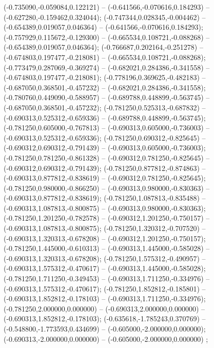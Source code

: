  (-0.735090,-0.059084,0.122121) -- (-0.641566,-0.070616,0.184293) -- (-0.627280,-0.159462,0.324044);
 (-0.747344,0.028345,-0.004462) -- (-0.654389,0.019057,0.046364) -- (-0.641566,-0.070616,0.184293);
 (-0.757929,0.115672,-0.129300) -- (-0.665534,0.108721,-0.088268) -- (-0.654389,0.019057,0.046364);
 (-0.766687,0.202164,-0.251278) -- (-0.674803,0.197477,-0.218081) -- (-0.665534,0.108721,-0.088268);
 (-0.773479,0.287069,-0.369274) -- (-0.682021,0.284386,-0.341558) -- (-0.674803,0.197477,-0.218081);
 (-0.778196,0.369625,-0.482183) -- (-0.687050,0.368501,-0.457232) -- (-0.682021,0.284386,-0.341558);
 (-0.780760,0.449090,-0.588957) -- (-0.689788,0.448899,-0.563745) -- (-0.687050,0.368501,-0.457232);
 (-0.781250,0.525313,-0.687832) -- (-0.690313,0.525312,-0.659336) -- (-0.689788,0.448899,-0.563745);
 (-0.781250,0.605000,-0.767813) -- (-0.690313,0.605000,-0.736003) -- (-0.690313,0.525312,-0.659336);
 (-0.781250,0.690312,-0.825645) -- (-0.690312,0.690312,-0.791439) -- (-0.690313,0.605000,-0.736003);
 (-0.781250,0.781250,-0.861328) -- (-0.690312,0.781250,-0.825645) -- (-0.690312,0.690312,-0.791439);
 (-0.781250,0.877812,-0.874863) -- (-0.690313,0.877812,-0.838619) -- (-0.690312,0.781250,-0.825645);
 (-0.781250,0.980000,-0.866250) -- (-0.690313,0.980000,-0.830363) -- (-0.690313,0.877812,-0.838619);
 (-0.781250,1.087813,-0.835488) -- (-0.690313,1.087813,-0.800875) -- (-0.690313,0.980000,-0.830363);
 (-0.781250,1.201250,-0.782578) -- (-0.690312,1.201250,-0.750157) -- (-0.690313,1.087813,-0.800875);
 (-0.781250,1.320312,-0.707520) -- (-0.690313,1.320313,-0.678208) -- (-0.690312,1.201250,-0.750157);
 (-0.781250,1.445000,-0.610313) -- (-0.690313,1.445000,-0.585028) -- (-0.690313,1.320313,-0.678208);
 (-0.781250,1.575312,-0.490957) -- (-0.690313,1.575312,-0.470617) -- (-0.690313,1.445000,-0.585028);
 (-0.781250,1.711250,-0.349453) -- (-0.690313,1.711250,-0.334976) -- (-0.690313,1.575312,-0.470617);
 (-0.781250,1.852812,-0.185801) -- (-0.690313,1.852812,-0.178103) -- (-0.690313,1.711250,-0.334976);
 (-0.781250,2.000000,0.000000) -- (-0.690313,2.000000,0.000000) -- (-0.690313,1.852812,-0.178103);
 (-0.635618,-1.785243,0.370769) -- (-0.548800,-1.773593,0.434699) -- (-0.605000,-2.000000,0.000000);
 (-0.690313,-2.000000,0.000000) -- (-0.605000,-2.000000,0.000000) ;
